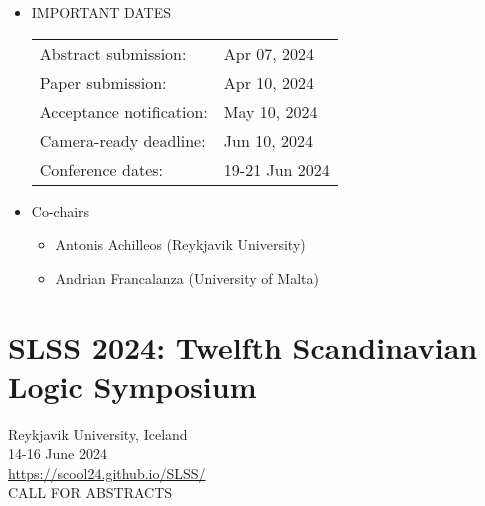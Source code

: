 \documentclass[prodmode,acmtecs]{acmsmall} %
\begin{document}
\begin{itemize}
\item  IMPORTANT DATES 
 
\begin{tabulary}{\linewidth}{LL}Abstract submission:  & Apr 07, 2024 \\
Paper submission:  & Apr 10, 2024 \\
Acceptance notification:  & May 10, 2024 \\
Camera-ready deadline:  & Jun 10, 2024 \\
Conference dates:  & 19-21 Jun 2024 \\
\end{tabulary}
 
\item  Co-chairs  
 
\begin{itemize}\item  Antonis Achilleos (Reykjavik University)
\item  Andrian Francalanza (University of Malta)
\end{itemize} 
\end{itemize}\section{SLSS 2024: Twelfth Scandinavian Logic Symposium}\label{SLSS2024}  Reykjavik University, Iceland\\ 
  14-16 June 2024 \\ 
  \href{https://scool24.github.io/SLSS/}{https://scool24.github.io/SLSS/}\\ 
CALL FOR ABSTRACTS 
\end{document}
